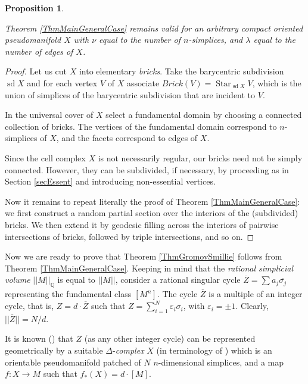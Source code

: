\documentclass[12pt]{amsart}
\theoremstyle{plain}
\newtheorem{proposition}[theorem]{Proposition}
\theoremstyle{definition}
\theoremstyle{plain}
\theoremstyle{definition}
\DeclareMathOperator{\sd}{sd}
\DeclareMathOperator{\Star}{Star}
\begin{document}
       
     \begin{proposition}\label{PropPseudomanifold}
     
     Theorem \ref{ThmMainGeneralCase} remains valid for an arbitrary compact oriented pseudomanifold $X$  with $\nu$ equal to the number of $n$-simplices, and $\lambda$ equal to the number of edges of $X$.
   
   \end{proposition}
   \begin{proof}
     Let us cut $X$ into elementary \textit{bricks}. Take the barycentric subdivision $\sd X$ and for each vertex $V$ of $X$ associate $Brick(V) = \Star_{\sd X}V$, which is the union of simplices of the barycentric subdivision that are incident to $V$. 
     
    In the universal cover of $X$ select a fundamental domain by choosing a connected collection of bricks. The vertices of the fundamental domain correspond to $n$-simplices of $X$, and the facets correspond to edges of $X$.
     
     Since the cell complex $X$ is not necessarily regular, our bricks need not be simply connected. However, they can be subdivided, if necessary, by proceeding as in Section \ref{secEssent} and introducing non-essential vertices.
     
     
     Now it remains to repeat literally the proof of Theorem \ref{ThmMainGeneralCase}: we first construct a random partial section over the interiors of the (subdivided) bricks. We then extend it by geodesic filling across the interiors of pairwise intersections of bricks, followed by triple intersections, and so on.
   \end{proof}


Now we are ready to prove that Theorem \ref{ThmGromovSmillie} follows from  Theorem \ref{ThmMainGeneralCase}.
Keeping in mind that the \textit{rational simplicial volume}  $||M||_{\mathbb{Q}}$  is equal to $||M|| $,
consider  a rational singular cycle $\overline{Z}=\sum a_j \overline{\sigma_j}$  representing the fundamental class $[M^n]$. The cycle $\overline{Z}$ is a multiple of  an integer cycle, that is,  $Z=d\cdot \overline{Z}$ such that $Z =\sum \limits_{i=1}^{N} \varepsilon_i\sigma_i$, with $\varepsilon_i = \pm 1$. Clearly,  $||\overline{Z}|| = N/d$. 

It is known  (\cite{Hatcher}) that $Z$ (as any other integer cycle)  can be represented geometrically by a suitable $\Delta$-\textit{complex} $X$ (in terminology of \cite{Hatcher}) which is  an orientable {pseudomanifold}  patched of $N$ $n$-dimensional simplices, and a map $f:X \rightarrow M$ such that $f_*(X)=d\cdot [M]$.
\end{document}
